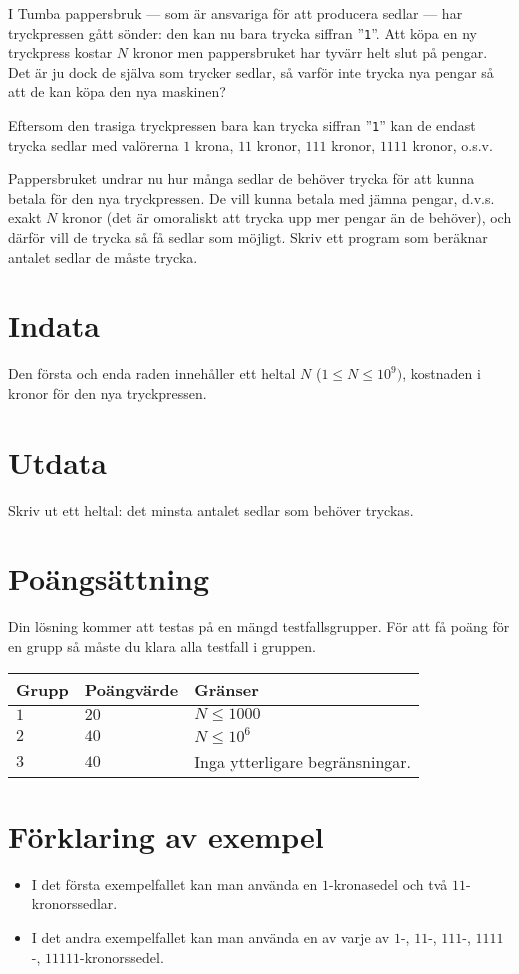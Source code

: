 I Tumba pappersbruk --- som är ansvariga för att producera sedlar --- har tryckpressen gått sönder: den kan nu bara trycka siffran ”\texttt{1}”.
Att köpa en ny tryckpress kostar $N$ kronor men pappersbruket har tyvärr helt slut på pengar.
Det är ju dock de själva som trycker sedlar, så varför inte trycka nya pengar så att de kan köpa den nya maskinen?

Eftersom den trasiga tryckpressen bara kan trycka siffran ”\texttt{1}” kan de endast trycka sedlar med valörerna $1$ krona, $11$ kronor, $111$ kronor, $1111$ kronor, o.s.v.

Pappersbruket undrar nu hur många sedlar de behöver trycka för att kunna betala för den nya tryckpressen.
De vill kunna betala med jämna pengar, d.v.s. exakt $N$ kronor (det är omoraliskt att trycka upp mer pengar än de behöver), och därför vill de trycka så få sedlar som möjligt.
Skriv ett program som beräknar antalet sedlar de måste trycka.

\section*{Indata}
Den första och enda raden innehåller ett heltal $N$ ($1 \le N \le 10^9)$, kostnaden i kronor för den nya tryckpressen.

\section*{Utdata}
Skriv ut ett heltal: det minsta antalet sedlar som behöver tryckas.

\section*{Poängsättning}
Din lösning kommer att testas på en mängd testfallsgrupper.
För att få poäng för en grupp så måste du klara alla testfall i gruppen.

\noindent
\begin{tabular}{| l | l | l |}
  \hline
  \textbf{Grupp} & \textbf{Poängvärde} & \textbf{Gränser} \\ \hline
  $1$    & $20$        &  $ N \leq 1000 $ \\ \hline 
  $2$    & $40$        &  $ N \leq 10^6 $ \\ \hline
  $3$    & $40$        &  Inga ytterligare begränsningar. \\ \hline
\end{tabular}

\section*{Förklaring av exempel}
\begin{itemize}
  \item I det första exempelfallet kan man använda en $1$-kronasedel och två $11$-kronorssedlar.
  \item I det andra exempelfallet kan man använda en av varje av $1$-, $11$-, $111$-, $1111$-, $11111$-kronorssedel.
\end{itemize}
